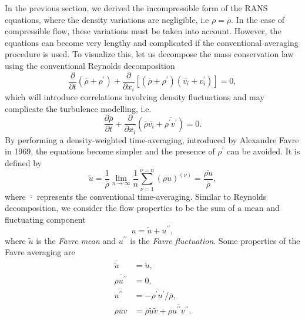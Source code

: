 In the previous section, we derived the incompressible form of the RANS equations, where the density variations are negligible, i.e $\rho=\overline{\rho}$. In the case of compressible flow, these variations must be taken into account. However, the equations can become very lengthy and complicated if the conventional averaging procedure is used. To visualize this, let us decompose the mass conservation law using the conventional Reynolds decomposition
\begin{equation}
    \frac{\partial}{\partial t} \left(\overline{\rho} + \rho^\prime\right) + \frac{\partial }{\partial x_i} \left[\left(\overline{\rho}+\rho^\prime\right)\left(\overline{v_i}+v_i^\prime\right)\right] = 0,
\end{equation}
which will introduce correlations involving density fluctuations and may complicate the turbulence modelling, i.e.
\begin{equation}
    \frac{\partial \overline{\rho}}{\partial t}  + \frac{\partial }{\partial x_i} \left(\overline \rho \overline{v_i} + \overline{\rho^\prime v^\prime}\right) = 0.
\end{equation}
By performing a density-weighted time-averaging, introduced by Alexandre Favre in 1969, the equations become simpler and the presence of $\rho^\prime$ can be avoided. It is defined by
\begin{equation}
    \tilde{u}=  \frac{1}{\overline{\rho}} \lim_{n\rightarrow\infty} \frac{1}{n}\sum_{\nu=1}^{\nu=n}\left(\rho u\right)^{(\nu)} = \frac{\overline{\rho u}}{\overline{\rho}},
    \label{eqn:favre_definition}
\end{equation}
where $\overline{\cdot}$ represents the conventional time-averaging. Similar to Reynolds decomposition, we consider the flow properties to be the sum of a mean and fluctuating component
\begin{equation}
    u = \tilde{u} + u^{\prime\prime},
\end{equation}
where $\tilde{u}$ is the \textit{Favre mean} and $u^{\prime\prime}$ is the \textit{Favre fluctuation}. Some properties of the Favre averaging are
\begin{align}
    \overline{\tilde{u}} &= \tilde{u},\\
    \overline{\rho u^{\prime\prime}} &= 0, \\
    \overline{u^{\prime\prime}} &= -\overline{\rho^\prime u^\prime}/{\overline{\rho}}, \\ 
    \overline{\rho u v} &= \overline{\rho}\tilde u\tilde v + \overline{\rho u^{\prime\prime}v^{\prime\prime}}. \label{eqn:favre_rhouv}
\end{align}
